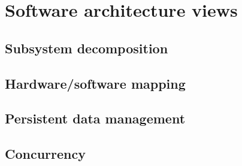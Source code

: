 \section{Software architecture views}
\subsection{Subsystem decomposition}
\subsection{Hardware/software mapping}
\subsection{Persistent data management}
\subsection{Concurrency}





